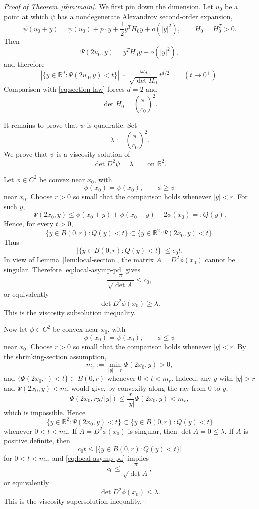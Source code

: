 \documentclass[11pt]{amsart}
\def\R{\mathbb{R}}
\begin{document}
\begin{proof}[Proof of Theorem~\ref{thm:main}]
We first pin down the dimension.  Let $u_0$ be a point at which $\psi$ has a
nondegenerate Alexandrov second-order expansion,
\[
    \psi(u_0+y)=\psi(u_0)+p\cdot y+\frac12 y^TH_0y+o(|y|^2),
    \qquad H_0=H_0^T>0.
\]
Then
\[
    \Psi(2u_0,y)=y^TH_0y+o(|y|^2),
\]
and therefore
\[
    |\{y\in\R^d:\Psi(2u_0,y)<t\}|
    \sim \frac{\omega_d}{\sqrt{\det H_0}}t^{d/2}
    \qquad (t\to0^+).
\]
Comparison with \eqref{eq:section-law} forces $d=2$ and
\[
    \det H_0=\left(\frac{\pi}{c_0}\right)^2.
\]

It remains to prove that $\psi$ is quadratic.  Set
\[
    \lambda:=\left(\frac{\pi}{c_0}\right)^2.
\]
We prove that $\psi$ is a viscosity solution of
\begin{equation}\label{eq:MA}
    \det D^2\psi=\lambda
    \qquad\text{on }\R^2.
\end{equation}

Let $\phi\in C^2$ be convex near $x_0$, with
\[
    \phi(x_0)=\psi(x_0),\qquad \phi\geq\psi
\]
near $x_0$.  Choose $r>0$ so small that the comparison holds whenever
$|y|<r$.  For such $y$,
\[
    \Psi(2x_0,y)
    \leq
    \phi(x_0+y)+\phi(x_0-y)-2\phi(x_0)=:Q(y).
\]
Hence, for every $t>0$,
\[
    \{y\in B(0,r):Q(y)<t\}
    \subset \{y\in\R^2:\Psi(2x_0,y)<t\}.
\]
Thus
\[
    |\{y\in B(0,r):Q(y)<t\}|\leq c_0t.
\]
In view of Lemma~\ref{lem:local-section}, the matrix $A=D^2\phi(x_0)$ cannot
be singular.  Therefore \eqref{eq:local-asymp-pd} gives
\[
    \frac{\pi}{\sqrt{\det A}}\leq c_0,
\]
or equivalently
\[
    \det D^2\phi(x_0)\geq \lambda.
\]
This is the viscosity subsolution inequality.

Now let $\phi\in C^2$ be convex near $x_0$, with
\[
    \phi(x_0)=\psi(x_0),\qquad \phi\leq\psi
\]
near $x_0$.  Choose $r>0$ so small that the comparison holds whenever
$|y|<r$.  By the shrinking-section assumption,
\[
    m_r:=\min_{|y|=r}\Psi(2x_0,y)>0,
\]
and $\{\Psi(2x_0,\cdot)<t\}\subset B(0,r)$ whenever $0<t<m_r$.  Indeed,
any $y$ with $|y|>r$ and $\Psi(2x_0,y)<m_r$ would give, by convexity along
the ray from $0$ to $y$,
\[
    \Psi(2x_0,r y/|y|)
    \leq \frac{r}{|y|}\Psi(2x_0,y)<m_r,
\]
which is impossible.  Hence
\[
    \{y\in\R^2:\Psi(2x_0,y)<t\}
    \subset \{y\in B(0,r):Q(y)<t\}
\]
whenever $0<t<m_r$.
If $A=D^2\phi(x_0)$ is singular, then $\det A=0\leq \lambda$.  If $A$ is
positive definite, then
\[
    c_0t\leq |\{y\in B(0,r):Q(y)<t\}|
\]
for $0<t<m_r$, and \eqref{eq:local-asymp-pd} implies
\[
    c_0\leq \frac{\pi}{\sqrt{\det A}},
\]
or equivalently
\[
    \det D^2\phi(x_0)\leq \lambda.
\]
This is the viscosity supersolution inequality.


\end{proof}
\end{document}
